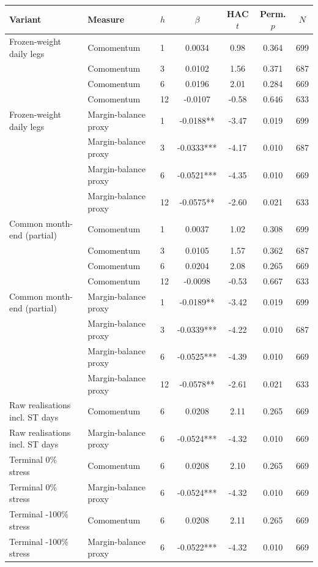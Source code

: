 \begingroup\footnotesize\setlength{\tabcolsep}{2pt}
\begin{tabular}{lllcccc}
\toprule
Variant & Measure & $h$ & $\beta$ & HAC $t$ & Perm. $p$ & $N$ \\
\midrule
Frozen-weight daily legs & Comomentum & 1 & 0.0034 & 0.98 & 0.364 & 699 \\
 & Comomentum & 3 & 0.0102 & 1.56 & 0.371 & 687 \\
 & Comomentum & 6 & 0.0196 & 2.01 & 0.284 & 669 \\
 & Comomentum & 12 & -0.0107 & -0.58 & 0.646 & 633 \\
Frozen-weight daily legs & Margin-balance proxy & 1 & -0.0188** & -3.47 & 0.019 & 699 \\
 & Margin-balance proxy & 3 & -0.0333*** & -4.17 & 0.010 & 687 \\
 & Margin-balance proxy & 6 & -0.0521*** & -4.35 & 0.010 & 669 \\
 & Margin-balance proxy & 12 & -0.0575** & -2.60 & 0.021 & 633 \\
Common month-end (partial) & Comomentum & 1 & 0.0037 & 1.02 & 0.308 & 699 \\
 & Comomentum & 3 & 0.0105 & 1.57 & 0.362 & 687 \\
 & Comomentum & 6 & 0.0204 & 2.08 & 0.265 & 669 \\
 & Comomentum & 12 & -0.0098 & -0.53 & 0.667 & 633 \\
Common month-end (partial) & Margin-balance proxy & 1 & -0.0189** & -3.42 & 0.019 & 699 \\
 & Margin-balance proxy & 3 & -0.0339*** & -4.22 & 0.010 & 687 \\
 & Margin-balance proxy & 6 & -0.0525*** & -4.39 & 0.010 & 669 \\
 & Margin-balance proxy & 12 & -0.0578** & -2.61 & 0.021 & 633 \\
Raw realisations incl. ST days & Comomentum & 6 & 0.0208 & 2.11 & 0.265 & 669 \\
Raw realisations incl. ST days & Margin-balance proxy & 6 & -0.0524*** & -4.32 & 0.010 & 669 \\
Terminal 0\% stress & Comomentum & 6 & 0.0208 & 2.10 & 0.265 & 669 \\
Terminal 0\% stress & Margin-balance proxy & 6 & -0.0524*** & -4.32 & 0.010 & 669 \\
Terminal -100\% stress & Comomentum & 6 & 0.0208 & 2.11 & 0.265 & 669 \\
Terminal -100\% stress & Margin-balance proxy & 6 & -0.0522*** & -4.32 & 0.010 & 669 \\

\end{tabular}
